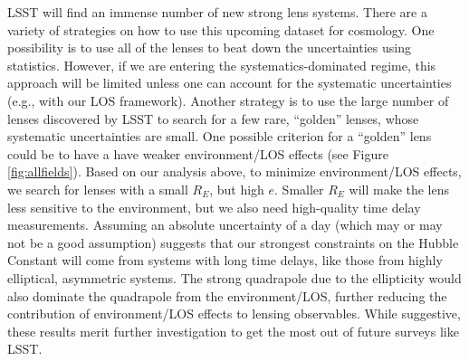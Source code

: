 LSST will find an immense number of new strong lens systems. There are a variety of strategies on how to use this upcoming dataset for cosmology. One possibility is to use all of the lenses to beat down the uncertainties using statistics. However, if we are entering the systematics-dominated regime, this approach will be limited unless one can account for the systematic uncertainties (e.g., with our LOS framework). Another strategy is to use the large number of lenses discovered by LSST to search for a few rare, ``golden'' lenses, whose systematic uncertainties are small. One possible criterion for a ``golden'' lens could be to have a have weaker environment/LOS effects (see Figure \ref{fig:allfields}). Based on our analysis above, to minimize environment/LOS effects, we search for lenses with a small $R_E$, but high $e$. Smaller $R_E$ will make the lens less sensitive to the environment, but we also need high-quality time delay measurements. Assuming an absolute uncertainty of a day (which may or may not be a good assumption) suggests that our strongest constraints on the Hubble Constant will come from systems with long time delays, like those from highly elliptical, asymmetric systems. The strong quadrapole due to the ellipticity would also dominate the quadrapole from the environment/LOS, further reducing the contribution of environment/LOS effects to lensing observables. While suggestive, these results merit further investigation to get the most out of future surveys like LSST.
  